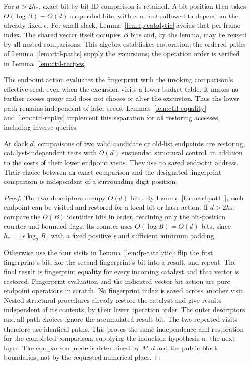 For $d>2h_*$, exact bit-by-bit ID comparison is retained.  A bit position
then takes $O(\log B)=O(d)$ suspended bits, with constants allowed to
depend on the already fixed $\epsilon$.  For small slack,
Lemma~\ref{lem:fp-catalytic} avoids that per-frame index.  The shared
vector itself occupies $B$ bits and, by the lemma, may be reused by all
nested comparisons.  This algebra establishes restoration; the
ordered paths of Lemma~\ref{lem:ctrl-paths} supply the excursions;
the operation order is verified in Lemma~\ref{lem:ctrl-recipes}.

The endpoint action evaluates the fingerprint with the invoking comparison's
effective seed, even when the excursion visits a lower-budget table.
It makes no further access query and does not choose or alter the
excursion.  Thus the lower path remains independent of later seeds.
Lemmas~\ref{lem:ctrl-equality} and~\ref{lem:ctrl-replay} implement this
separation for all restoring accesses, including inverse queries.

\begin{lemma}\label{lem:ctrl-equality}
At slack $d$, comparisons of two valid candidate or old-list endpoints
are restoring, catalyst-independent tests with $O(d)$ suspended
structural control, in addition to the costs of their lower endpoint
visits.  They use no saved endpoint address.  Their choice between an
exact comparison and the designated fingerprint comparison is
independent of a surrounding digit position.
\end{lemma}

\begin{proof}
The two descriptors occupy $O(d)$ bits.  By
Lemma~\ref{lem:ctrl-paths}, each endpoint can be visited and restored for
a local bit or hash action.  If $d>2h_*$, compare the $O(B)$ identifier
bits in order, retaining only the bit-position counter and bounded
flags.  Its counter uses $O(\log B)=O(d)$ bits, since
$h_*=\lfloor\epsilon\log_2 B\rfloor$ with a fixed positive
$\epsilon$ and sufficient minimum padding.

Otherwise use the four visits in Lemma~\ref{lem:fp-catalytic}: flip the
first fingerprint's bit, xor the second fingerprint's bit into a result, and repeat.
The final result is fingerprint equality for every incoming catalyst and that
vector is restored.  Fingerprint evaluation and the indicated vector-bit
action are pure endpoint operations in scratch.  No fingerprint index is saved
across another visit.  Nested structural procedures already restore the
catalyst and give results independent of its contents, by their lower
operation order.  The outer descriptors and all path choices ignore
the accumulated result bit.  The two repeated visits therefore use
identical paths.  This proves the same independence and restoration
for the completed comparison, supplying the induction hypothesis at
the next layer.  The comparison mode is determined by $M,d$ and the
public block boundaries, not by the requested numerical place.
\end{proof}

